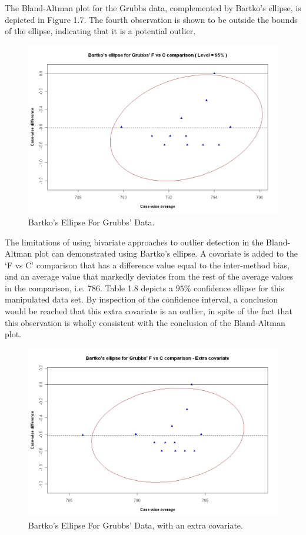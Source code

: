 \documentclass[Chap2main.tex]{subfiles}
\begin{document}

The Bland-Altman plot for the Grubbs data, complemented by Bartko's ellipse, is depicted in Figure 1.7. The fourth observation is shown to be outside the bounds of the ellipse, indicating that it is a potential outlier.


\begin{figure}[h!]
	\includegraphics[width=130mm]{GrubbsBartko.jpeg}
	\caption{Bartko's Ellipse For Grubbs' Data.}\label{GrubbsBartko}
\end{figure}

The limitations of using bivariate approaches to outlier detection in the Bland-Altman plot can demonstrated using Bartko's ellipse.
A covariate is added to the `F vs C' comparison that has a difference value equal to the inter-method bias, and an average
value that markedly deviates from the rest of the average values in the comparison, i.e. 786. Table 1.8 depicts a $95\%$ confidence
ellipse for this manipulated data set. By inspection of the confidence interval, a conclusion would be reached that this extra
covariate is an outlier, in spite of the fact that this observation is wholly consistent with the conclusion of the
Bland-Altman plot.

\begin{figure}[h!]
	\includegraphics[width=130mm]{GrubbsBartko2.jpeg}
	\caption{Bartko's Ellipse For Grubbs' Data, with an extra covariate.}\label{GrubbsBartko2}
\end{figure}
\end{document}
